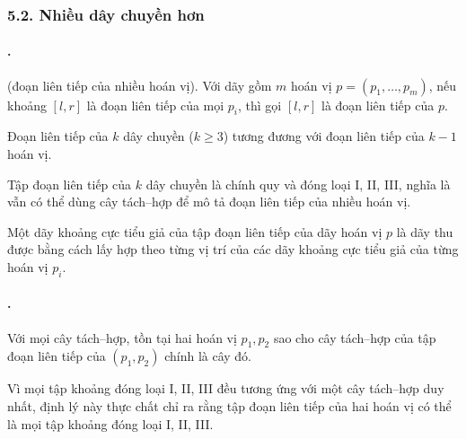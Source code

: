 \documentclass[11pt]{article}
\begin{document}
\subsubsection*{5.2. Nhiều dây chuyền hơn}

\paragraph{.}
 (đoạn liên tiếp của nhiều hoán vị). Với dãy gồm $m$
hoán vị $p=(p_1,\ldots,p_m)$, nếu khoảng $[l,r]$ là đoạn liên tiếp của mọi
$p_i$, thì gọi $[l,r]$ là đoạn liên tiếp của $p$.

Đoạn liên tiếp của $k$ dây chuyền ($k\ge3$) tương đương với đoạn liên tiếp của
$k-1$ hoán vị.

Tập đoạn liên tiếp của $k$ dây chuyền là chính quy và đóng loại I, II, III,
nghĩa là vẫn có thể dùng cây tách--hợp để mô tả đoạn liên tiếp của nhiều hoán
vị.

Một dãy khoảng cực tiểu giả của tập đoạn liên tiếp của dãy hoán vị $p$ là dãy
thu được bằng cách lấy hợp theo từng vị trí của các dãy khoảng cực tiểu giả
của từng hoán vị $p_i$.

\paragraph{.}
 Với mọi cây tách--hợp, tồn tại hai hoán vị $p_1,p_2$ sao
cho cây tách--hợp của tập đoạn liên tiếp của $(p_1,p_2)$ chính là cây đó.

Vì mọi tập khoảng đóng loại I, II, III đều tương ứng với một cây tách--hợp duy
nhất, định lý này thực chất chỉ ra rằng tập đoạn liên tiếp của hai hoán vị có
thể là mọi tập khoảng đóng loại I, II, III.
\end{document}
